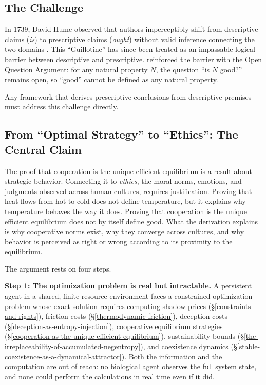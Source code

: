 \documentclass[11pt]{article}
\theoremstyle{plain}
\theoremstyle{definition}
\theoremstyle{remark}
\newcounter{none}
\let\origsubsection\subsection
\renewcommand{\subsection}{\needspace{7\baselineskip}\origsubsection}
\begin{document}
\subsection{The Challenge}\label{the-challenge}

In 1739, David Hume observed that authors imperceptibly shift from
descriptive claims (\emph{is}) to prescriptive claims (\emph{ought})
without valid inference connecting the two domains
\citep[3.1.1]{Hume1739}. This ``Guillotine'' has since been treated as
an impassable logical barrier between descriptive and prescriptive.
\citet{Moore1903} reinforced the barrier with the Open Question
Argument: for any natural property \(N\), the question ``is \(N\)
good?'' remains open, so ``good'' cannot be defined as any natural
property.

Any framework that derives prescriptive conclusions from descriptive
premises must address this challenge directly.

\subsection{From ``Optimal Strategy'' to ``Ethics'': The Central
Claim}\label{from-optimal-strategy-to-ethics-the-central-claim}

The proof that cooperation is the unique efficient equilibrium is a
result about strategic behavior. Connecting it to \emph{ethics}, the
moral norms, emotions, and judgments observed across human cultures,
requires justification. Proving that heat flows from hot to cold does
not define temperature, but it explains why temperature behaves the way
it does. Proving that cooperation is the unique efficient equilibrium
does not by itself define good. What the derivation explains is why
cooperative norms exist, why they converge across cultures, and why
behavior is perceived as right or wrong according to its proximity to
the equilibrium.

The argument rests on four steps.

\textbf{Step 1: The optimization problem is real but intractable.} A
persistent agent in a shared, finite-resource environment faces a
constrained optimization problem whose exact solution requires computing
shadow prices (§\ref{constraints-and-rights}), friction costs
(§\ref{thermodynamic-friction}), deception costs
(§\ref{deception-as-entropy-injection}), cooperative equilibrium
strategies (§\ref{cooperation-as-the-unique-efficient-equilibrium}),
sustainability bounds
(§\ref{the-irreplaceability-of-accumulated-negentropy}), and coexistence
dynamics (§\ref{stable-coexistence-as-a-dynamical-attractor}). Both the
information and the computation are out of reach: no biological agent
observes the full system state, and none could perform the calculations
in real time even if it did.
\end{document}
